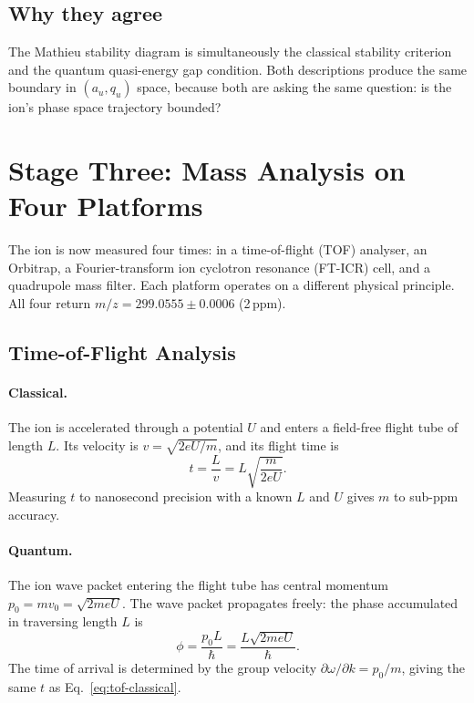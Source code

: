 \subsection*{Why they agree}
The Mathieu stability diagram is simultaneously the classical stability
criterion and the quantum quasi-energy gap condition.
Both descriptions produce the same boundary in $(a_u, q_u)$ space, because
both are asking the same question: is the ion's phase space trajectory bounded?

\section{Stage Three: Mass Analysis on Four Platforms}
\label{sec:ch1-analyzers}

The ion is now measured four times: in a time-of-flight (TOF) analyser,
an Orbitrap, a Fourier-transform ion cyclotron resonance (FT-ICR) cell,
and a quadrupole mass filter.
Each platform operates on a different physical principle.
All four return $m/z = 299.0555 \pm 0.0006$ (2\,ppm).

\subsection{Time-of-Flight Analysis}
\label{sec:ch1-tof}

\paragraph{Classical.}
The ion is accelerated through a potential $U$ and enters a field-free flight
tube of length $L$.
Its velocity is $v = \sqrt{2eU/m}$, and its flight time is
\begin{equation}\label{eq:tof-classical}
  t = \frac{L}{v} = L\sqrt{\frac{m}{2eU}}.
\end{equation}
Measuring $t$ to nanosecond precision with a known $L$ and $U$ gives $m$ to
sub-ppm accuracy.

\paragraph{Quantum.}
The ion wave packet entering the flight tube has central momentum
$p_0 = m v_0 = \sqrt{2meU}$.
The wave packet propagates freely: the phase accumulated in traversing
length $L$ is
\begin{equation}\label{eq:tof-quantum}
  \phi = \frac{p_0 L}{\hbar} = \frac{L\sqrt{2meU}}{\hbar}.
\end{equation}
The time of arrival is determined by the group velocity $\partial\omega/\partial k
= p_0/m$, giving the same $t$ as Eq.~\eqref{eq:tof-classical}.


